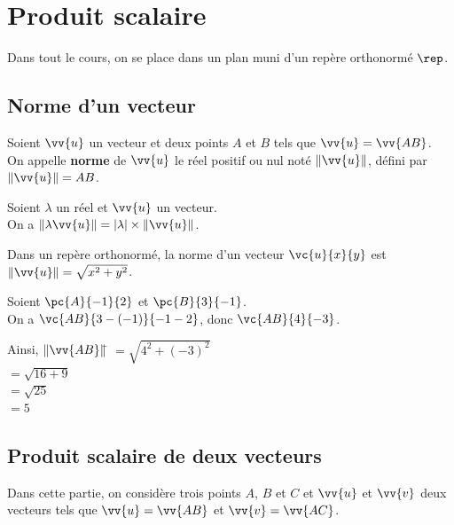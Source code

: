 \documentclass[a4paper,11pt,cours]{nsi} %
\begin{document}
\setcounter{chapter}{8} %



\chapter{Produit scalaire}


Dans tout le cours, on se place dans un plan muni d'un repère orthonormé $\rep$.
\section{Norme d'un vecteur}

\begin{definition}[]
    Soient $\vv{u}$ un vecteur et deux points $A$ et $B$ tels que $\vv{u} = \vv{AB}$.\\
    On appelle \textbf{norme} de $\vv{u}$ le réel positif ou nul noté $\left\|\vv{u}\right\|$, défini par $\left\|\vv{u}\right\| = AB$.
\end{definition}

\begin{propriete}[]
    Soient $\lambda$ un réel et $\vv{u}$ un vecteur.\\
    On a $\left\|\lambda \vv{u}\right\| = \left|\lambda\right| \times \left\|\vv{u}\right\|$.
\end{propriete}

\begin{propriete}[]
    Dans un repère orthonormé, la norme d'un vecteur $\vc{u}{x}{y}$ est $\left\|\vv{u}\right\| = \sqrt{x^2 + y^2}$.
\end{propriete}

\begin{exemple}[]
    Soient $\pc{A}{-1}{2}$ et $\pc{B}{3}{-1}$.\\[.5em]
    On a $\vc{AB}{3-(-1)}{-1-2}$, donc $\vc{AB}{4}{-3}$.
    \begin{tabbing}
         Ainsi, $\left\|\vv{AB}\right\|$\= $= \sqrt{4^2 + (-3)^2}$\\
         \>$ = \sqrt{16 + 9}$\\
         \>$ = \sqrt{25}$\\
         \>$ = 5$
    \end{tabbing}
\end{exemple}
\newpage

\section{Produit scalaire de deux vecteurs}
Dans cette partie, on considère trois points $A$, $B$ et $C$ et $\vv{u}$ et $\vv{v}$ deux vecteurs tels que $\vv{u} = \vv{AB}$ et $\vv{v} = \vv{AC}$.\\
\end{document}
